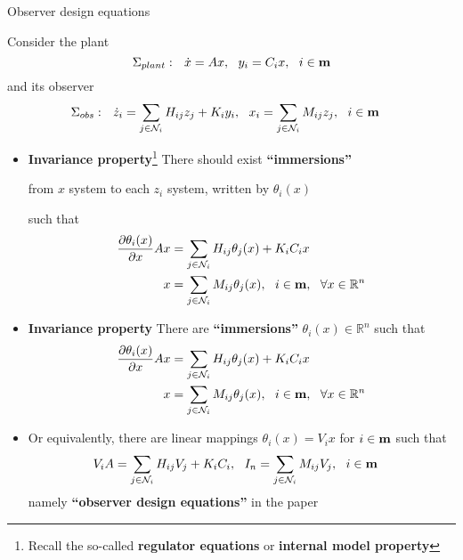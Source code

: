\documentclass{beamer}
\newcommand{\R}{\mathbb{R}}
\begin{document}
\begin{frame}{\color{blue} Observer design equations}

Consider the plant
\begin{equation*}
\Sigma_{plant}:~~ \dot{x}=A x,~~ y_{i}=C_{i}x,~~ i\in{\bf m}
\end{equation*}
and its observer
\begin{align*}
\Sigma_{obs}:~~ \dot{z}_{i}&=\sum_{j\in\mathcal{N}_{i}} H_{ij}z_{j} + K_{i}y_{i},~~ x_{i}=\sum_{j\in\mathcal{N}_{i}} M_{ij}z_{j},~~ i\in{\bf m}
\end{align*}

\begin{itemize}
  \item \textbf{Invariance property}\footnote{Recall the so-called \textbf{regulator equations} or \textbf{internal model property}} There should exist \textbf{``immersions''}
\begin{center}
{\color{red}from $x$ system to each $z_{i}$ system, written by $\theta_{i}(x)$ }
\end{center}
such that
\begin{align*}
\frac{\partial\theta_{i}(x)}{\partial x}Ax&=\sum_{j\in\mathcal{N}_{i}} H_{ij}\theta_{j}(x) + K_{i}C_{i}x \\
x&=\sum_{j\in\mathcal{N}_{i}} M_{ij}\theta_{j}(x),~~ i\in{\bf m},~~ \forall x\in\R^{n}
\end{align*}
\end{itemize}
\end{frame}




\begin{frame}{\color{blue} }

\begin{itemize}
  \item \textbf{Invariance property} There are \textbf{``immersions''} {\color{red} $\theta_{i}(x)\in\R^{n}$ } such that
\begin{align*}
\frac{\partial\theta_{i}(x)}{\partial x}Ax&=\sum_{j\in\mathcal{N}_{i}} H_{ij}\theta_{j}(x) + K_{i}C_{i}x \\
x&=\sum_{j\in\mathcal{N}_{i}} M_{ij}\theta_{j}(x),~~ i\in{\bf m},~~ \forall x\in\R^{n}
\end{align*}

  \item [] Or equivalently, there are {\color{red} linear mappings $\theta_{i}(x)=V_{i}x$} for $i\in{\bf m}$ such that
\begin{align*}
V_{i}A&=\sum_{j\in\mathcal{N}_{i}} H_{ij}V_{j} + K_{i}C_{i},~~
I_{n}=\sum_{j\in\mathcal{N}_{i}} M_{ij}V_{j},~~ i\in{\bf m}
\end{align*}
namely \textbf{``observer design equations''} in the paper
\end{itemize}
\end{frame}
\end{document}
